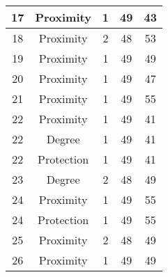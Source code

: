 \documentclass[results.tex]{subfiles}
\begin{document}
\begin{center}
\begin{tabular}{| c || c | c | c | c |}
            \hline
            17                      & Proximity                    & 1                      & 49                      & 43                   \\
            \hline
            18                      & Proximity                    & 2                      & 48                      & 53                   \\
            \hline
            19                      & Proximity                    & 1                      & 49                      & 49                   \\
            \hline
            20                      & Proximity                    & 1                      & 49                      & 47                   \\
            \hline
            21                      & Proximity                    & 1                      & 49                      & 55                   \\
            \hline
            22                      & Proximity                    & 1                      & 49                      & 41                   \\
            \hline
            22                      & Degree                       & 1                      & 49                      & 41                   \\
            \hline
            22                      & Protection                   & 1                      & 49                      & 41                   \\
            \hline
            23                      & Degree                       & 2                      & 48                      & 49                   \\
            \hline
            24                      & Proximity                    & 1                      & 49                      & 55                   \\
            \hline
            24                      & Protection                   & 1                      & 49                      & 55                   \\
            \hline
            25                      & Proximity                    & 2                      & 48                      & 49                   \\
            \hline
            26                      & Proximity                    & 1                      & 49                      & 49                   \\

\end{tabular}
\end{center}
\end{document}
